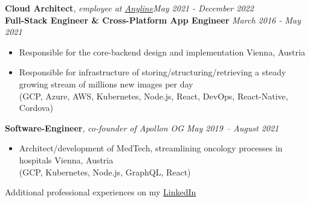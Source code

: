 \documentclass[9pt]{extarticle}
\begin{document}
\noindent
{\bf Cloud Architect}, \textit{employee at \href{https://anyline.com}{Anyline}}\hfill \textit{May 2021 - December 2022} \\
{\bf Full-Stack Engineer \& Cross-Platform App Engineer}  \hfill \textit{March 2016 - May 2021} 
\begin{itemize}
\setlength\itemsep{0.05em}
\item Responsible for the core-backend design and implementation \hfill Vienna, Austria 
\item Responsible for infrastructure of storing/structuring/retrieving a steady \\ 
growing stream of millions new images per day \\
(GCP, Azure, AWS, Kubernetes, Node.js, React, DevOps, React-Native, Cordova) \\
\end{itemize}

\noindent
{\bf Software-Engineer}, \textit{co-founder of Apollon OG}  \hfill \textit{May 2019 -- August 2021}
\begin{itemize}
\setlength\itemsep{0.05em}
\item Architect/development of MedTech, streamlining oncology processes in hospitals \hfill Vienna, Austria \\
(GCP, Kubernetes, Node.js, GraphQL, React) \\
\end{itemize}

\noindent
Additional professional experiences on my \href{https://www.linkedin.com/in/jonas-laux-2aaaa8105}{LinkedIn} \\
\end{document}
